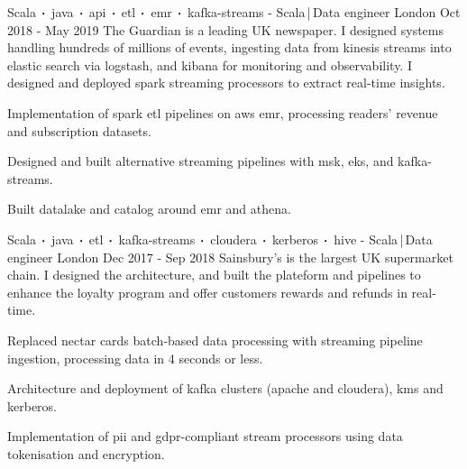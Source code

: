 \begin{cventries}
    \cventry
    {Scala$\sqbig$java$\sqbig$api$\sqbig$etl$\sqbig$emr$\sqbig$kafka-streams}
    { - Scala\,|\,Data engineer}
    {London}
    {Oct 2018 - May 2019}
    {The Guardian is a leading UK newspaper. I designed systems handling hundreds of millions of events, ingesting data from kinesis streams into elastic search via logstash, and kibana for monitoring and observability. I designed and deployed spark streaming processors to extract real-time insights.}
    {
        \begin{cvitems}
            \item{Implementation of spark etl pipelines on aws emr, processing readers' revenue and subscription datasets.}
            \item{Designed and built alternative streaming pipelines with msk, eks, and kafka-streams.}
            \item{Built datalake and catalog around emr and athena.}
        \end{cvitems}
    }

    \cventry
    {Scala$\sqbig$java$\sqbig$etl$\sqbig$kafka-streams$\sqbig$cloudera$\sqbig$kerberos$\sqbig$hive}
    { - Scala\,|\,Data engineer}
    {London}
    {Dec 2017 - Sep 2018}
    {Sainsbury's is the largest UK supermarket chain. I designed the architecture, and built the plateform and pipelines to enhance the loyalty program and offer customers rewards and refunds in real-time.}
    {
        \begin{cvitems}
            \item{Replaced nectar cards batch-based data processing with streaming pipeline ingestion, processing data in 4 seconds or less.}
            \item{Architecture and deployment of kafka clusters (apache and cloudera), kms and kerberos.}
            \item{Implementation of pii and gdpr-compliant stream processors using data tokenisation and encryption.}
        \end{cvitems}
    }


\end{cventries}
